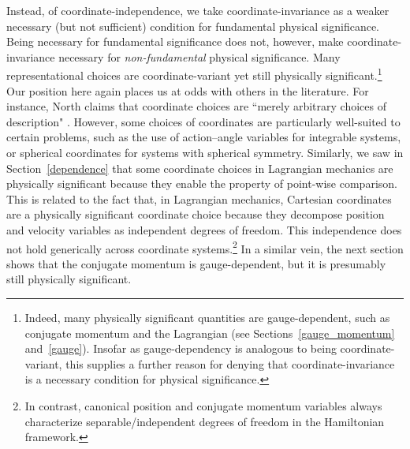 \documentclass[letterpaper]{article}
\begin{document}



Instead, of coordinate-independence, we take coordinate-invariance as a weaker necessary (but not sufficient) condition for fundamental physical significance. Being necessary for fundamental significance does not, however, make coordinate-invariance necessary for \textit{non-fundamental} physical significance. Many representational choices are coordinate-variant yet still physically significant.\footnote{Indeed, many physically significant quantities are gauge-dependent, such as conjugate momentum and the Lagrangian (see Sections~\ref{gauge_momentum} and~\ref{gauge}). Insofar as gauge-dependency is analogous to being coordinate-variant, this supplies a further reason for denying that coordinate-invariance is a necessary condition for physical significance.} Our position here again places us at odds with others in the literature. For instance, North claims that coordinate choices are ``merely arbitrary choices of description" \parencites*[61]{North}. However, some choices of coordinates are particularly well-suited to certain problems, such as the use of action--angle variables for integrable systems, or spherical coordinates for systems with spherical symmetry. Similarly, we saw in Section~\ref{dependence} that some coordinate choices in Lagrangian mechanics are physically significant because they enable the property of point-wise comparison. This is related to the fact that, in Lagrangian mechanics, Cartesian coordinates are a physically significant coordinate choice because they decompose position and velocity variables as independent degrees of freedom. This independence does not hold generically across coordinate systems.\footnote{In contrast, canonical position and conjugate momentum variables always characterize separable/independent degrees of freedom in the Hamiltonian framework.} In a similar vein, the next section shows that the conjugate momentum is gauge-dependent, but it is presumably still physically significant. 
\end{document}
